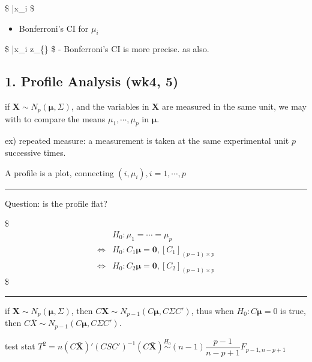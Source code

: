 \documentclass[
]{book}
\providecommand{\tightlist}{%
  \setlength{\itemsep}{0pt}\setlength{\parskip}{0pt}}
\begin{document}
{{{\$
\bar x\_i \pm {} 
\$

\begin{itemize}
\tightlist
\item
  Bonferroni's CI for \(\mu_i\)
\end{itemize}

\$
\bar x\_i \pm z\_\{\}
\$
- Bonferroni's CI is more precise. as also.

\hypertarget{profile-analysis-wk4-5}{%
\subsection{1. Profile Analysis (wk4, 5)}\label{profile-analysis-wk4-5}}

if \(\pmb X \sim N_p (\pmb \mu, \Sigma)\), and the variables in \(\pmb X\) are measured in the same unit, we may with to compare the means \(\mu_1 , \cdots, \mu_p\) in \(\pmb \mu\).

ex) repeated measure: a measurement is taken at the same experimental unit \(p\) successive times.

A profile is a plot, connecting \((i, \mu_i), i= 1, \cdots, p\)

\begin{center}\rule{0.5\linewidth}{0.5pt}\end{center}

Question: is the profile flat?

\$
\begin{align*}

&H_0: \mu_1 = \cdots = \mu_p \\

\iff &H_0: C_1 \pmb \mu = \pmb 0 , \left[ C_1\right]_{(p-1) \times p} \\

\iff &H_0: C_2 \pmb \mu = \pmb 0 , \left[ C_2\right]_{(p-1) \times p}

\end{align*}
\$

\begin{center}\rule{0.5\linewidth}{0.5pt}\end{center}

if \(\pmb X \sim N_p (\pmb \mu, \Sigma)\), then \(C \pmb X \sim N_{p-1} (C \pmb \mu, C \Sigma C')\), thus when \(H_0 : C \pmb \mu = 0\) is true, then \(C \bar X \sim N_{p-1} (C \pmb \mu, C \Sigma C')\).

test stat \(T^2 = n (C \bar {\pmb X})' (C S C')^{-1} (C \bar {\pmb X}) \overset{H_0}{\sim} (n-1) \dfrac{p-1}{n-p+1} F_{p-1,n-p+1}\)

}}}
\end{document}
